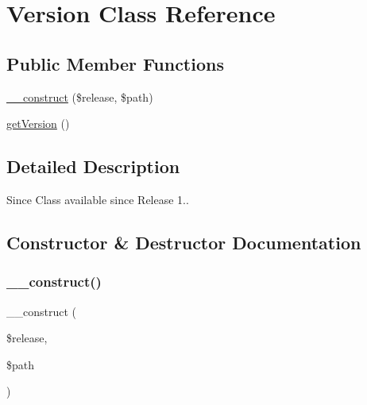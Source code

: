 \hypertarget{class_sebastian_bergmann_1_1_version}{}\section{Version Class Reference}
\label{class_sebastian_bergmann_1_1_version}
\subsection*{Public Member Functions}
\begin{DoxyCompactItemize}
\item 
\mbox{\hyperlink{class_sebastian_bergmann_1_1_version_a66f960c649f472a51d65548b542ca018}{\+\_\+\+\_\+construct}} (\$release, \$path)
\item 
\mbox{\hyperlink{class_sebastian_bergmann_1_1_version_afa8e7a3a646144eab50188b7a805a389}{get\+Version}} ()
\end{DoxyCompactItemize}


\subsection{Detailed Description}
\begin{DoxySince}{Since}
Class available since Release 1.. 
\end{DoxySince}


\subsection{Constructor \& Destructor Documentation}
\mbox{\label{class_sebastian_bergmann_1_1_version_a66f960c649f472a51d65548b542ca018}} 
\subsubsection{\texorpdfstring{\+\_\+\+\_\+construct()}{\_\_construct()}}
{\footnotesize\ttfamily \+\_\+\+\_\+construct (\begin{DoxyParamCaption}\item[{}]{\$release,  }\item[{}]{\$path }\end{DoxyParamCaption})}


